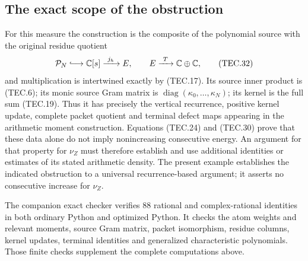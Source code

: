 \subsection{The exact scope of the obstruction}

For this measure the construction is the composite of the polynomial
source with the original residue quotient
\[
 \mathcal P_N\lhook\joinrel\longrightarrow\mathbb C[s]
       \xrightarrow{\ j_h\ } E,
 \qquad E\xrightarrow{\ T\ }\mathbb C\oplus\mathbb C,
                                                                    \tag{TEC.32}
\]
and multiplication is intertwined exactly by (TEC.17).  Its source
inner product is (TEC.6); its monic source Gram matrix is
\(\operatorname{diag}(\kappa_0,\ldots,\kappa_N)\); its kernel is
the full sum (TEC.19).  Thus it has precisely the vertical recurrence,
positive kernel update, complete packet quotient and terminal defect
maps appearing in the arithmetic moment construction.  Equations
(TEC.24) and (TEC.30) prove that these data alone do not imply
nonincreasing consecutive energy.  An argument for that property for
\(\nu_Z\) must therefore establish and use additional identities or
estimates of its stated arithmetic density.  The present example
establishes the indicated obstruction to a universal recurrence-based
argument; it asserts no consecutive increase for \(\nu_Z\).

The companion exact checker verifies 88 rational and complex-rational
identities in both ordinary Python and optimized Python.  It checks
the atom weights and relevant moments, source Gram matrix, packet
isomorphism, residue columns, kernel updates, terminal identities and
generalized characteristic polynomials.  Those finite checks
supplement the complete computations above.
